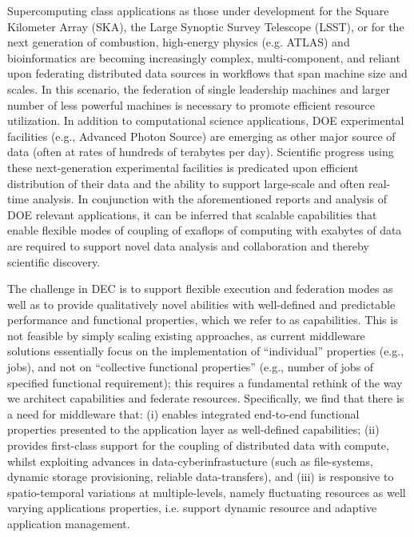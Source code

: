 \documentclass[11pt,final]{article}
\begin{document}
{%

Supercomputing class applications as those under development for the
Square Kilometer Array (SKA), the Large Synoptic Survey Telescope
(LSST), or for the next generation of combustion, high-energy physics
(e.g. ATLAS) and bioinformatics are becoming increasingly complex,
multi-component, and reliant upon federating distributed data sources
in workflows that span machine size and scales.  In this scenario, the
federation of single leadership machines and larger number of less
powerful machines is necessary to promote efficient resource
utilization.  In addition to computational science applications, DOE
experimental facilities (e.g., Advanced Photon Source) are emerging as
other major source of data (often at rates of hundreds of terabytes
per day).  Scientific progress using these next-generation
experimental facilities is predicated upon efficient distribution of
their data and the ability to support large-scale and often real-time
analysis.  In conjunction with the aforementioned reports and
analysis %
of DOE relevant applications, it can be inferred that scalable
capabilities that enable flexible modes of coupling of exaflops of
computing with exabytes of data are required to support novel data
analysis and collaboration and thereby scientific discovery.



The challenge in DEC is to support flexible execution and federation
modes as well as to provide qualitatively novel abilities with
well-defined and predictable performance and functional properties,
which we refer to as capabilities.  This is not feasible by simply
scaling existing approaches, as current middleware solutions
essentially focus on the implementation of ``individual'' properties
(e.g., jobs), and not on ``collective functional properties'' (e.g.,
number of jobs of specified functional requirement); this requires a
fundamental rethink of the way we architect capabilities and federate
resources.  Specifically, we find that there is a need for middleware
that: (i) enables integrated end-to-end functional properties
presented to the application layer as well-defined capabilities; (ii)
provides first-class support for the coupling of distributed data with
compute, whilst exploiting advances in data-cyberinfrastucture (such
as file-systems, dynamic storage provisioning, reliable
data-transfers), and (iii) is responsive to spatio-temporal variations
at multiple-levels, namely fluctuating resources as well varying
applications properties, i.e. support dynamic resource and adaptive
application management.

}
\end{document}
